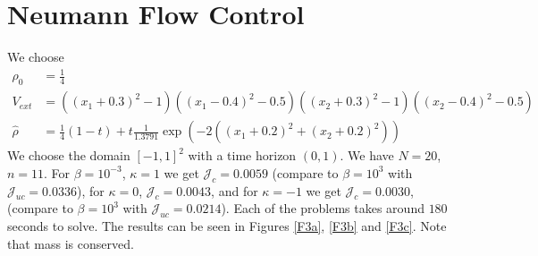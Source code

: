 \documentclass[11pt, a4paper]{article}
\theoremstyle{definition}
\newcommand{\hr}{\widehat \rho}
\begin{document}
	\section{Neumann Flow Control}
	We choose 
	\begin{align*}
		\rho_0 &= \frac{1}{4}\\
		V_{ext} &= \left(\left(x_1 + 0.3\right)^2 - 1\right)\left(\left(x_1-0.4\right)^2 - 0.5\right)
		\left(\left(x_2 + 0.3\right)^2 - 1\right)\left(\left(x_2-0.4\right)^2 - 0.5\right)\\
		\hr &= \frac{1}{4}(1-t) + t\frac{1}{1.3791}\exp{\left(-2\left(\left(x_1+0.2\right)^2 + \left(x_2+0.2\right)^2\right)\right)}
	\end{align*}
	We choose the domain $[-1,1]^2$ with a time horizon $(0,1)$. We have $N = 20$, $n = 11$. 
	For $\beta = 10^{-3}$, $\kappa = 1$ we get $\mathcal J_c = 0.0059$ (compare to $\beta = 10^3$ with $\mathcal J_{uc} = 0.0336$), for $\kappa = 0$, $\mathcal J_c = 0.0043$, and for $\kappa = - 1$ we get $\mathcal J_c = 0.0030$, (compare to $\beta = 10^3$ with $\mathcal J_{uc} = 0.0214$). Each of the problems takes around $180$ seconds to solve. The results can be seen in Figures \ref{F3a}, \ref{F3b} and \ref{F3c}. Note that mass is conserved.
\end{document}
